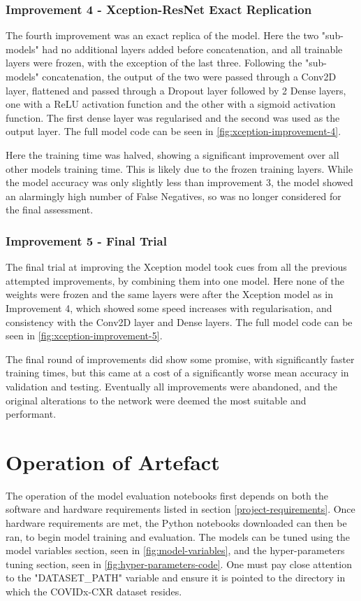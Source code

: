 \subsubsection{Improvement 4 - Xception-ResNet Exact Replication}
The fourth improvement was an exact replica of the \cite{fitriasari2021improvement} model. Here the two "sub-models" had no additional layers added before concatenation, and all trainable layers were frozen, with the exception of the last three. Following the "sub-models" concatenation, the output of the two were passed through a Conv2D layer, flattened and passed through a Dropout layer followed by 2 Dense layers, one with a ReLU activation function and the other with a sigmoid activation function. The first dense layer was regularised and the second was used as the output layer. The full model code can be seen in \autoref{fig:xception-improvement-4}.

Here the training time was halved, showing a significant improvement over all other models training time. This is likely due to the frozen training layers. While the model accuracy was only slightly less than improvement 3, the model showed an alarmingly high number of False Negatives, so was no longer considered for the final assessment.

\subsubsection{Improvement 5 - Final Trial}
The final trial at improving the Xception model took cues from all the previous attempted improvements, by combining them into one model. Here none of the weights were frozen and the same layers were after the Xception model as in Improvement 4, which showed some speed increases with regularisation, and consistency with the Conv2D layer and Dense layers. The full model code can be seen in \autoref{fig:xception-improvement-5}.

The final round of improvements did show some promise, with significantly faster training times, but this came at a cost of a significantly worse mean accuracy in validation and testing. Eventually all improvements were abandoned, and the original alterations to the network were deemed the most suitable and performant.

\section{Operation of Artefact}
The operation of the model evaluation notebooks first depends on both the software and hardware requirements listed in section \ref{project-requirements}. Once hardware requirements are met, the Python notebooks downloaded can then be ran, to begin model training and evaluation. The models can be tuned using the model variables section, seen in \autoref{fig:model-variables}, and the hyper-parameters tuning section, seen in \autoref{fig:hyper-parameters-code}. One must pay close attention to the "DATASET\_PATH" variable and ensure it is pointed to the directory in which the COVIDx-CXR dataset resides.

